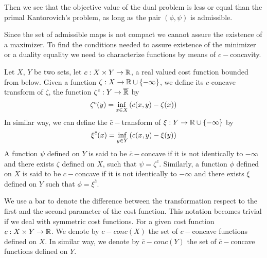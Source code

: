 Then we see that the objective value of the dual problem is less or equal than the primal Kantorovich's problem, as long as the pair $(\phi, \psi)$ is admissible.


 Since the set of admissible maps is not compact we cannot assure the existence of a maximizer. To find the conditions needed to assure existence of the minimizer or a duality equality we need to characterize functions by means of $c-$concavity.

\begin{definition}
	Let $X$, $Y$ be two sets, let $c:X\times Y \rightarrow \mathbb{R}$, a real valued cost function bounded from below. Given a function $\zeta: X\rightarrow \mathbb{R}\cup\left\lbrace -\infty \right\rbrace$, we define its $c$-concave transform of $\zeta$, the function $\zeta^c: Y\rightarrow \overline{\mathbb{R}}$ by
	\begin{equation}
	\zeta^c(y)=\inf_{x\in X}\left( c(x,y)-\zeta(x) \right)
	\end{equation}
	In similar way, we can define the $\bar{c}-$transform of $\xi: Y\rightarrow \mathbb{R}\cup\left\lbrace -\infty \right\rbrace$ by
	\begin{equation}
	\xi^{\bar{c}}(x)=\inf_{y\in Y}\left( c(x, y)-\xi(y) \right)
	\end{equation}
	A function $\psi$ defined on $Y$ is said to be $\bar c-$concave if it is not identically to $-\infty$ and there exists $\zeta$ defined on $X$, such that $\psi=\zeta^c$. Similarly, a function $\phi$ defined on $X$ is said to be $ c-$concave if it is not identically to $-\infty$ and there exists $\xi$ defined on $Y$ such that $\phi=\xi^{\bar{c}}$.
\end{definition}

We use a bar to denote the difference between the transformation respect to the first and the second parameter of the cost function. This notation becomes trivial if we deal with symmetric cost functions.
For a given cost function $c:X\times Y\rightarrow \mathbb{R}$. We denote by $c-conc(X)$ the set of $c-$concave  functions defined on $X$. In similar way, we denote by $\bar{c}-conc(Y)$ the set of $\bar{c}-$concave functions defined on $Y$. 

